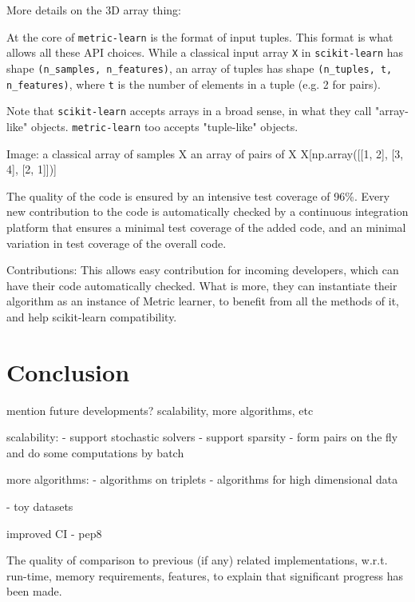 \documentclass[twoside,11pt]{article}
\begin{document}
More details on the 3D array thing: 

At the core of \texttt{metric-learn} is the format of input tuples. This format is what allows all these API choices. While a classical input array \texttt{X} in \texttt{scikit-learn} has shape \texttt{(n\_samples, n\_features)}, an array of tuples has shape \texttt{(n\_tuples, t, n\_features)}, where \texttt{t} is the number of elements in a tuple (e.g. 2 for pairs).

Note that \texttt{scikit-learn} accepts arrays in a broad sense, in what they call "array-like" objects. \texttt{metric-learn} too accepts "tuple-like" objects.


Image: a classical array of samples X
an array of pairs of X X[np.array([[1, 2], [3, 4], [2, 1]])]



The quality of the code is ensured by an intensive test coverage of 96\%. Every new contribution to the code is automatically checked by a continuous integration platform that ensures a minimal test coverage of the added code, and an minimal variation in test coverage of the overall code. 

Contributions: This allows easy contribution for incoming developers, which can have their code automatically checked. What is more, they can instantiate their algorithm as an instance of Metric learner, to benefit from all the methods of it, and help scikit-learn compatibility. 

\section{Conclusion}

mention future developments? scalability, more algorithms, etc

scalability: 
- support stochastic solvers
- support sparsity
- form pairs on the fly and do some computations by batch

more algorithms:
- algorithms on triplets
- algorithms for high dimensional data

- toy datasets

improved CI
- pep8


 The quality of comparison to previous (if any) related implementations, w.r.t. run-time, memory requirements, features, to explain that significant progress has been made. 



\end{document}
